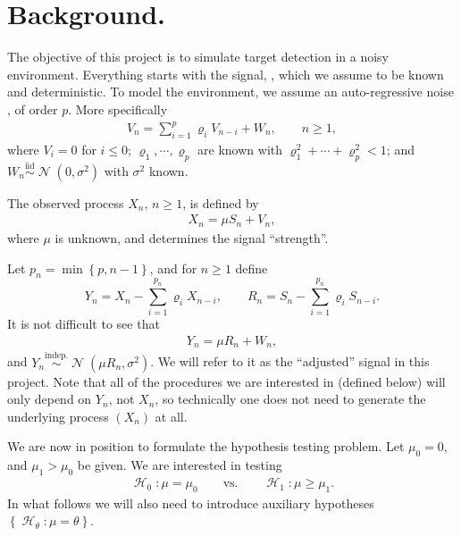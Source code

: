 \documentclass[12pt]{article}
\renewcommand{\geq}{\geqslant}
\renewcommand{\leq}{\leqslant}
\newcommand{\nolabel}[1]{}
\newcommand{\set}[1]{\left\{ #1 \right\}}
\newcommand{\iid}{\overset{\text{iid}}{\sim}}
\newcommand{\indep}{\overset{\text{indep.}}{\sim}}
\DeclareMathOperator{\Hyp}{\mathcal{H}}
\DeclareMathOperator{\DNormal}{\mathcal{N}} %
\newcommand{\tX}{Y}
\newcommand{\tS}{R}
\begin{document}
\section*{Background.}

The objective of this project is to simulate target detection in a noisy environment. Everything starts with the signal, \fbox{$S_n$, $n \geq 1$}, which we assume to be known and deterministic. To model the environment, we assume an auto-regressive noise \fbox{$V_n$, $n \geq 1$}, of order $p$. More specifically
\begin{align*} \nolabel{eq:ar_noise}
    V_n = \sum _{i = 1} ^{p} \varrho _i V_{n - i} + W_n, \qquad n \geq 1,
\end{align*}
where $V_i = 0$ for $i \leq 0$; $\varrho _1, \cdots , \varrho _p$ are known with $\varrho _1 ^2 + \cdots + \varrho _p ^2 < 1$; and $W_n \iid \DNormal (0, \sigma ^2)$ with $\sigma ^2$ known.

The observed process $X_n$, $n \geq 1$, is defined by
\begin{align*} \nolabel{eq:observed_process}
    \boxed{X_n = \mu S_n + V_n},
\end{align*}
where $\mu $ is unknown, and determines the signal ``strength''.


Let $p_n = \min \set{p, n - 1}$, and for $n \geq 1$ define
\[
    \tX _n = X_n - \sum _{i = 1} ^{p_n} \varrho _i X_{n - i}, \qquad
    \tS _n = S_n - \sum _{i = 1} ^{p_n} \varrho _i S_{n - i}.
\]
It is not difficult to see that
\begin{align} \label{eq:adjusted_process}
    \tX _n = \mu \tS _n + W_n,
\end{align}
and $\tX _n \indep \DNormal (\mu \tS _n, \sigma ^2)$. We will refer to it as the ``adjusted'' signal in this project. Note that all of the procedures we are interested in (defined below) will only depend on $\tX _n$, not $X_n$, so technically one does not need to generate the underlying process $(X_n)$ at all.

We are now in position to formulate the hypothesis testing problem.
%
Let $\mu _0 = 0$, and $\mu _1 > \mu _0$ be given. We are interested in testing
\begin{align} \label{eq:model}
    \boxed{
        \Hyp _0 : \mu = \mu _0
        \qquad \text{vs.} \qquad
        \Hyp _1 : \mu \geq \mu _1.
    }
\end{align}
In what follows we will also need to introduce auxiliary hypotheses $\set{\Hyp _\theta : \mu = \theta }$.
\end{document}
